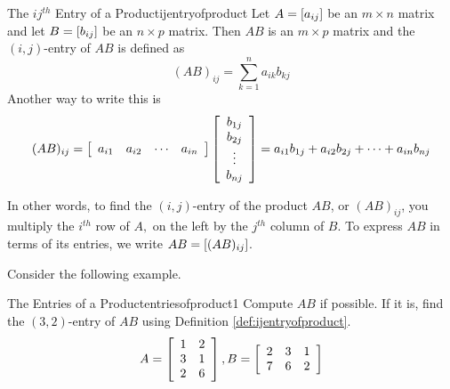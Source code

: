 \begin{definition}{The $ij^{th}$ Entry of a Product}{ijentryofproduct}
Let $A=\left[ a_{ij}\right] $ be an $m\times n$ matrix and
let $B=\left[ b_{ij}\right] $ be an $n\times p$ matrix. Then $AB$ is an 
$m\times p$ matrix and the $\left( i, j \right)$-entry of $AB$  is defined as 
\begin{equation*}
(AB)_{ij}=\sum_{k=1}^{n}a_{ik}b_{kj}  
\end{equation*}
Another way to write this is
\begin{equation*}
(AB)_{ij}=\left[
\begin{array}{cccc}
a_{i1} & a_{i2} & \cdots & a_{in}
\end{array}
\right] \left[
\begin{array}{c}
b_{1j} \\
b_{2j} \\
\vdots \\
b_{nj}
\end{array}
\right]
= 
a_{i1}b_{1j} + a_{i2}b_{2j} + \cdots + a_{in}b_{nj}
\end{equation*}
\end{definition}

In other words, to find the $\left( i, j \right)$-entry of the product $AB$, or $(AB)_{ij}$,
you multiply the $i^{th}$ row of 
$A,$ on the left by the $j^{th}$ column of $B$. To express $AB$ in terms of its entries, we write $AB = \left[ (AB)_{ij} \right]$.

Consider the following example. 

\begin{example}{The Entries of a Product}{entriesofproduct1}
Compute $AB$ if possible. If it is, find the $\left( 3,2 \right)$-entry of $AB$ using Definition \ref{def:ijentryofproduct}. 
\begin{equation*}
A = \left[
\begin{array}{cc}
1 & 2 \\
3 & 1 \\
2 & 6
\end{array}
\right], B = \left[
\begin{array}{ccc}
2 & 3 & 1 \\
7 & 6 & 2
\end{array}
\right]
\end{equation*}
\end{example}


